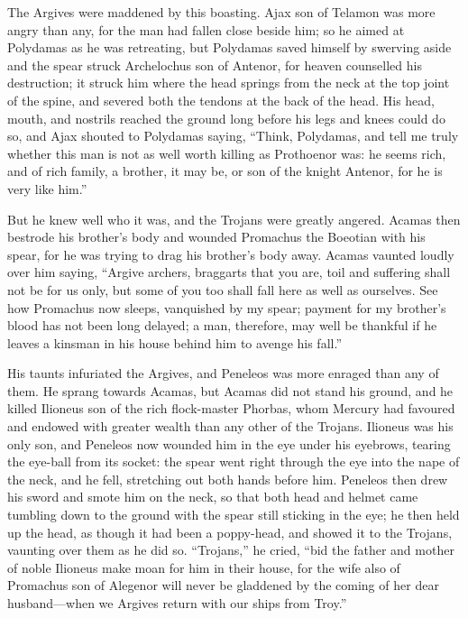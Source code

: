 The Argives were maddened by this boasting. Ajax son of Telamon was more
angry than any, for the man had fallen close beside him; so he aimed at
Polydamas as he was retreating, but Polydamas saved himself by swerving
aside and the spear struck Archelochus son of Antenor, for heaven
counselled his destruction; it struck him where the head springs from the
neck at the top joint of the spine, and severed both the tendons at the
back of the head. His head, mouth, and nostrils reached the ground long
before his legs and knees could do so, and Ajax shouted to Polydamas
saying, “Think, Polydamas, and tell me truly whether this man is not as
well worth killing as Prothoenor was: he seems rich, and of rich family, a
brother, it may be, or son of the knight Antenor, for he is very like
him.”

But he knew well who it was, and the Trojans were greatly angered. Acamas
then bestrode his brother’s body and wounded Promachus the Boeotian with
his spear, for he was trying to drag his brother’s body away. Acamas
vaunted loudly over him saying, “Argive archers, braggarts that you are,
toil and suffering shall not be for us only, but some of you too shall
fall here as well as ourselves. See how Promachus now sleeps, vanquished
by my spear; payment for my brother’s blood has not been long delayed; a
man, therefore, may well be thankful if he leaves a kinsman in his house
behind him to avenge his fall.”

His taunts infuriated the Argives, and Peneleos was more enraged than any
of them. He sprang towards Acamas, but Acamas did not stand his ground,
and he killed Ilioneus son of the rich flock-master Phorbas, whom Mercury
had favoured and endowed with greater wealth than any other of the
Trojans. Ilioneus was his only son, and Peneleos now wounded him in the
eye under his eyebrows, tearing the eye-ball from its socket: the spear
went right through the eye into the nape of the neck, and he fell,
stretching out both hands before him. Peneleos then drew his sword and
smote him on the neck, so that both head and helmet came tumbling down to
the ground with the spear still sticking in the eye; he then held up the
head, as though it had been a poppy-head, and showed it to the Trojans,
vaunting over them as he did so. “Trojans,” he cried, “bid the father and
mother of noble Ilioneus make moan for him in their house, for the wife
also of Promachus son of Alegenor will never be gladdened by the coming of
her dear husband—when we Argives return with our ships from Troy.”

